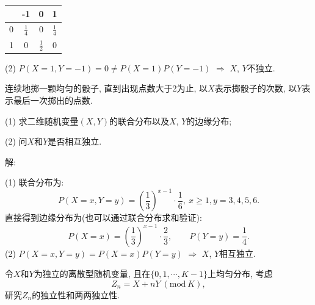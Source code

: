 \documentclass[standard]{ExBook}
\begin{document}
\begin{qitems}
\vspace{-5em}

    \begin{bbox}
\begin{center}
    \renewcommand{\arraystretch}{1.4}
    \setlength{\tabcolsep}{20pt}
    \begin{tabular}{c|c|c|c}
	    \hline
	    \diagbox{$X$}{$P(X,Y)$}{$Y$} & -1 & 0 & 1\\
	    \hline
	    0 & $\displaystyle\frac{1}{4}$ & 0 & $\displaystyle\frac{1}{4}$\\
	    \hline
	    1 & 0 & $\displaystyle\frac{1}{2}$ & 0\\
	    \hline
    \end{tabular}
\end{center}
(2) $P(X=1,Y=-1)=0\neq P(X=1)P(Y=-1)$ $\Longrightarrow$ $X$, $Y$不独立.
    \end{bbox}

\vspace{-5em}

    \begin{bbox}
    \begin{shaded}
        \qitem
连续地掷一颗均匀的骰子, 直到出现点数大于2为止, 以$X$表示掷骰子的次数, 以$Y$表示最后一次掷出的点数.

(1) 求二维随机变量$(X,Y)$的联合分布以及$X$, $Y$的边缘分布;

(2) 问$X$和$Y$是否相互独立.
    \end{shaded}
    \end{bbox}

\vspace{-5em}

    \begin{bbox}
解: 

(1) 联合分布为:
$$P(X=x,Y=y)=\left(\frac{1}{3}\right)^{x-1}\cdot\frac{1}{6},\ x\geq1,y=3,4,5,6.$$
直接得到边缘分布为(也可以通过联合分布求和验证):
$$P(X=x)=\left(\frac{1}{3}\right)^{x-1}\cdot\frac{2}{3},\qquad P(Y=y)=\frac{1}{4}.$$
(2) $P(X=x,Y=y)=P(X=x)P(Y=y)$ $\Longrightarrow$ $X$, $Y$相互独立.
    \end{bbox}

\vspace{-5em}

    \begin{bbox}
    \begin{shaded}
        \qitem
令$X$和$Y$为独立的离散型随机变量, 且在$\{0,1,\cdots,K-1\}$上均匀分布, 考虑
$$Z_n=X+nY\ (\text{mod}\ K),$$
研究$Z_n$的独立性和两两独立性.
    \end{shaded}
    \end{bbox}


\end{qitems}
\end{document}
